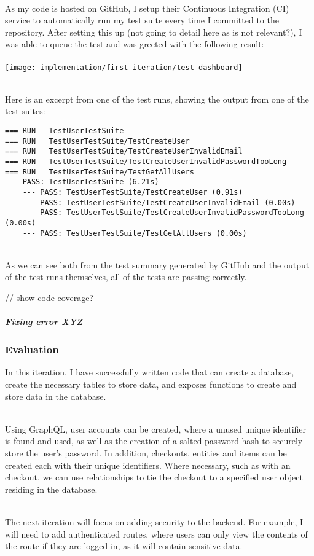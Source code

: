 \documentclass[../../main.tex]{subfiles}
\begin{document}
\noindent \\ As my code is hosted on GitHub, I setup their Continuous Integration (CI) service to automatically run my test suite every time I committed to the repository. After setting this up (not going to detail here as is not relevant?), I was able to queue the test and was greeted with the following result: \\\\

\texttt{[image: implementation/first iteration/test-dashboard]}

\noindent \\ Here is an excerpt from one of the test runs, showing the output from one of the test suites:

\begin{lstlisting}
=== RUN   TestUserTestSuite
=== RUN   TestUserTestSuite/TestCreateUser
=== RUN   TestUserTestSuite/TestCreateUserInvalidEmail
=== RUN   TestUserTestSuite/TestCreateUserInvalidPasswordTooLong
=== RUN   TestUserTestSuite/TestGetAllUsers
--- PASS: TestUserTestSuite (6.21s)
    --- PASS: TestUserTestSuite/TestCreateUser (0.91s)
    --- PASS: TestUserTestSuite/TestCreateUserInvalidEmail (0.00s)
    --- PASS: TestUserTestSuite/TestCreateUserInvalidPasswordTooLong (0.00s)
    --- PASS: TestUserTestSuite/TestGetAllUsers (0.00s)
\end{lstlisting}

\noindent \\ As we can see both from the test summary generated by GitHub and the output of the test runs themselves, all of the tests are passing correctly.

// show code coverage?

\subparagraph{Fixing error XYZ}

\subsubsection{Evaluation}

\noindent In this iteration, I have successfully written code that can create a database, create the necessary tables to store data, and exposes functions to create and store data in the database.

\noindent \\ Using GraphQL, user accounts can be created, where a unused unique identifier is found and used, as well as the creation of a salted password hash to securely store the user's password. In addition, checkouts, entities and items can be created each with their unique identifiers. Where necessary, such as with an checkout, we can use relationships to tie the checkout to a specified user object residing in the database.

\noindent \\ The next iteration will focus on adding security to the backend. For example, I will need to add authenticated routes, where users can only view the contents of the route if they are logged in, as it will contain sensitive data.
\end{document}
